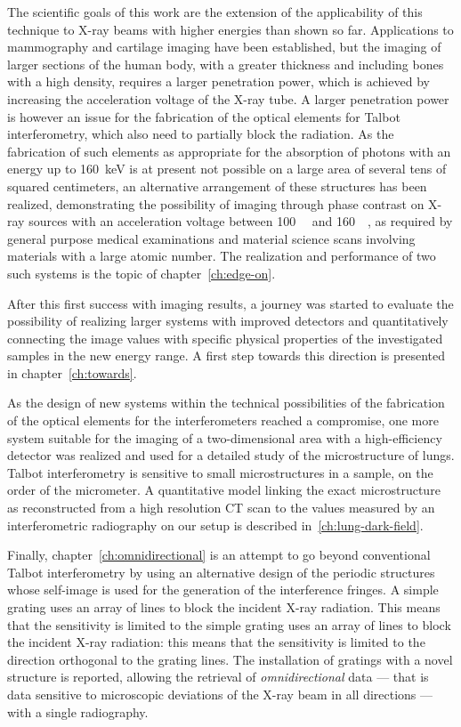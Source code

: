 The scientific goals of this work are the extension of the applicability of
this technique to X-ray beams with higher energies than shown so far.
Applications to mammography and cartilage imaging have been established, but
the imaging of larger sections of the human body, with a greater thickness
and including bones with a high density, requires a larger penetration
power, which is achieved by increasing the acceleration voltage of the X-ray
tube. A larger penetration power is however an issue for the fabrication of
the optical elements for Talbot interferometry, which also need to partially block the
radiation. As the fabrication of such elements as appropriate for the
absorption of photons with an energy up to \SI{160}{\kilo\eV} is at present
not possible on a large area of several tens of squared centimeters, an
alternative arrangement of these structures has been realized, demonstrating
the possibility of imaging through phase contrast on X-ray sources with an
acceleration voltage between \SI{100}{\kilo\voltpeak} and
\SI{160}{\kilo\voltpeak}, as required by general purpose medical
examinations and material science scans involving materials with a large
atomic number. The realization and performance of two such systems is the
topic of chapter~\ref{ch:edge-on}.

After this first success with imaging results, a journey was started to
evaluate the possibility of realizing larger systems with improved detectors
and quantitatively connecting the image values with specific physical
properties of the investigated samples in the new energy range. A first step
towards this direction is presented in chapter~\ref{ch:towards}.

As the design of new systems within the technical possibilities of the
fabrication of the optical elements for the interferometers reached a
compromise, one more system suitable for the imaging of a two-dimensional
area with a high-efficiency detector was realized and used for a detailed
study of the microstructure of lungs. Talbot interferometry is sensitive to
small microstructures in a sample, on the order of the micrometer. A
quantitative model linking the exact microstructure as reconstructed from a
high resolution \ac{CT} scan to the values measured by an interferometric
radiography on our setup is described in~\ref{ch:lung-dark-field}.

Finally, chapter~\ref{ch:omnidirectional} is an attempt to go beyond
conventional Talbot interferometry by using an alternative design of the
periodic structures whose self-image is used for the generation of the
interference fringes. A simple grating uses an array of lines to block the
incident X-ray radiation. This means that the sensitivity is limited to the
simple grating uses an array of lines to block the incident X-ray radiation:
this means that the sensitivity is limited to the direction orthogonal to
the grating lines. The installation of gratings with a novel structure is
reported, allowing the retrieval of \emph{omnidirectional} data --- that is
data sensitive to microscopic deviations of the X-ray beam in all directions
--- with a single radiography.
